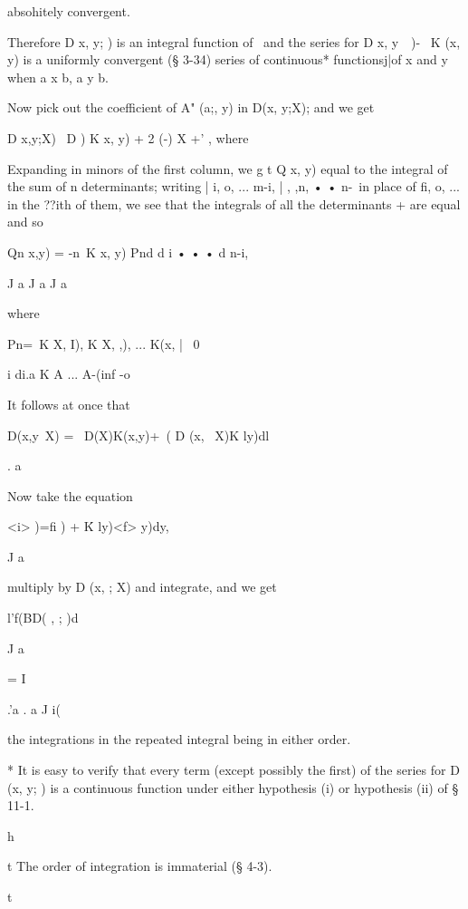 absohitely convergent. 

Therefore D  x, y;  )  is an integral function of \ and the series for 
D x, y\ \ )- \ K (x, y) is a uniformly convergent (§ 3-34) series of continuous* 
functionsj|of x and y when a x b, a y b. 

Now pick out the coefficient of A" (a;, y) in D(x, y;X); and we get 

D x,y;X)  \ D   ) K x, y) + 2 (-) X +'    , 
where 

Expanding in minors of the first column, we g t Q   x, y) equal to the 
integral of the sum of n determinants; writing | i,  o, ...  m-i, | ,  ,n, • •  n-\ 
in place of fi,  o, ...    in the ??ith of them, we see that the integrals of all 
the determinants + are equal and so 

Qn  x,y) = -n\     K  x, y) Pnd d i • • • d n-i, 

J a J a J a 

where 

Pn=\ K  X, I), K  X,  ,), ... K(x, | \ 0 

i di.a K    A ... A-(inf -o 



It follows at once that 

D(x,y\ X) = \ D(X)K(x,y)+\ ( D (x,  \ X)K ly)dl 

. a 

Now take the equation 

<i>  )=fi ) +  \' K ly)<f> y)dy, 

J a 

multiply by D (x,   ; X) and integrate, and we get 

l'f(BD( , ; )d  

J a 

= I %

.'a . a J i( 

the integrations in the repeated integral being in either order. 

* It is easy to verify that every term (except possibly the first) of the series for D (x, y;  )  
is a continuous function under either hypothesis (i) or hypothesis (ii) of § 11-1.   

h 



t The order of integration is immaterial (§ 4-3). 



t 



